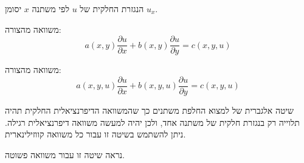 \documentclass{tstextbook}
\begin{document}
\begin{symbolize}
הנגזרת החלקית של \(u\) לפי משתנה \(x\) יסומן \(u_{x}\).

\end{symbolize}
\begin{definition}
משוואה מהצורה:
$$a(x,y){\frac{\partial u}{\partial x}}+b(x,y){\frac{\partial u}{\partial y}}=c(x,y,u)$$

\end{definition}
\begin{definition}
משוואה מהצורה:
$$a(x,y,u){\frac{\partial u}{\partial x}}+b(x,y,u){\frac{\partial u}{\partial y}}=c(x,y,u)$$

\end{definition}
\begin{definition}
שיטה אלגברית של למצוא החלפת משתנים כך שהמשוואה הדיפרנציאלית החלקית תהיה תלוייה רק בנגזרת חלקית של משתנה אחד, ולכן יהיה למעשה משוואה דיפרנציאלית רגילה. ניתן להשתמש בשיטה זו עבור כל משוואה קווזילינארית.

\end{definition}
נראה שיטה זו עבור משוואה פשוטה.
\end{document}

